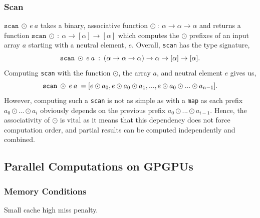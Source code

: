 \documentclass[11pt]{article}
\begin{document}

\subsubsection{Scan}
$\texttt{scan} \: \odot \: e \: a$ takes a binary, associative function $\odot \: : \: \alpha \to \alpha \to \alpha$ and returns a function
 $\mathtt{scan} \:\odot \: : \: \alpha \to [\alpha] \to [\alpha]$ which
 computes the $\odot$ prefixes of an input array $a$ starting with a neutral element, $e$. Overall, \texttt{scan} has the type signature,
$$\mathtt{scan} \: \odot \: e \: a \: : \:(\alpha \to \alpha \to \alpha) \to \alpha \to [\alpha] \to [\alpha]\mathnormal{.}$$
Computing \texttt{scan} with the function $\odot$, the array $a$, and neutral element $e$ gives us,
$$\mathtt{scan} \: \odot \: e \: a \: = [e \odot a_0, e \odot a_0 \odot a_1, ..., e \odot a_0 \odot ... \odot a_{n-1}]\mathnormal{.}$$
However, computing such a \texttt{scan} is not as simple as with a \texttt{map} as each prefix $a_0 \odot ... \odot a_i$ obviously depends on the previous prefix $a_0 \odot ... \odot a_{i-1}$. Hence, 
the associativity of $\odot$ is vital as it means that this dependency does not force computation order, and partial results can be computed independently and combined.


\subsection{Parallel Computations on GPGPUs}

\subsubsection{Memory Conditions}
Small cache high miss penalty.
\end{document}
